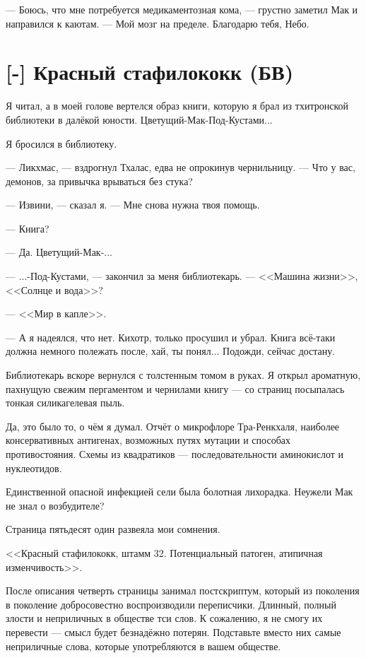 --- Боюсь, что мне потребуется медикаментозная кома, --- грустно заметил Мак и направился к каютам.
--- Мой мозг на пределе.
Благодарю тебя, Небо.

\section{[-] Красный стафилококк (БВ)}

Я читал, а в моей голове вертелся образ книги, которую я брал из тхитронской библиотеки в далёкой юности.
Цветущий-Мак-Под-Кустами...

Я бросился в библиотеку.

--- Ликхмас, --- вздрогнул Тхалас, едва не опрокинув чернильницу.
--- Что у вас, демонов, за привычка врываться без стука?

--- Извини, --- сказал я.
--- Мне снова нужна твоя помощь.

--- Книга?

--- Да.
Цветущий-Мак-...

--- ...-Под-Кустами, --- закончил за меня библиотекарь.
--- <<Машина жизни>>, <<Солнце и вода>>?

--- <<Мир в капле>>.

--- А я надеялся, что нет.
Кихотр, только просушил и убрал.
Книга всё-таки должна немного полежать после, хай, ты понял...
Подожди, сейчас достану.

Библиотекарь вскоре вернулся с толстенным томом в руках.
Я открыл ароматную, пахнущую свежим пергаментом и чернилами книгу --- со страниц посыпалась тонкая силикагелевая пыль.

Да, это было то, о чём я думал.
Отчёт о микрофлоре Тра-Ренкхаля, наиболее консервативных антигенах, возможных путях мутации и способах противостояния.
Схемы из квадратиков --- последовательности аминокислот и нуклеотидов.

Единственной опасной инфекцией сели была болотная лихорадка.
Неужели Мак не знал о возбудителе?

Страница пятьдесят один развеяла мои сомнения.

<<Красный стафилококк, штамм 32.
Потенциальный патоген, атипичная изменчивость>>.

После описания четверть страницы занимал постскриптум, который из поколения в поколение добросовестно воспроизводили переписчики.
Длинный, полный злости и неприличных в обществе тси слов.
К сожалению, я не смогу их перевести --- смысл будет безнадёжно потерян.
Подставьте вместо них самые неприличные слова, которые употребляются в вашем обществе.

